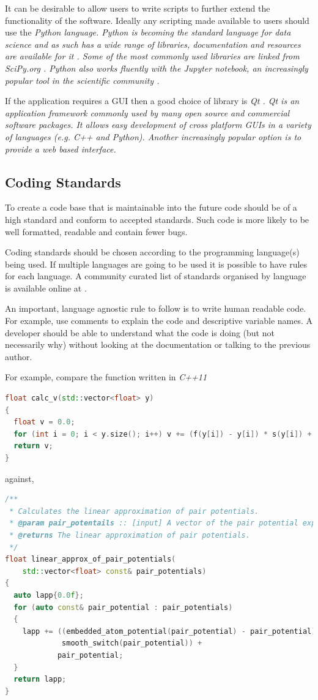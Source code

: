\documentclass[jnr]{iosart2x}
\begin{document}
It can be desirable to allow users to write scripts to further extend the functionality of the software.
Ideally any scripting made available to users should use the \it Python language.
Python is becoming the standard language for data science and as such has a wide range of libraries, documentation and resources are available for it \cite{python-nature}.
Some of the most commonly used libraries are linked from \it SciPy.org \cite{scipy}.
Python also works fluently with the \it{Jupyter notebook}, an increasingly popular tool in the scientific community \cite{jupyter-nature}.

If the application requires a GUI then a good choice of library is \it{Qt} \cite{Qt}.
\it Qt is an application framework commonly used by many open source and commercial software packages.
It allows easy development of cross platform GUIs in a variety of languages (e.g. \it C++ and \it Python).
Another increasingly popular option is to provide a web based interface.

\subsection{Coding Standards}
\label{Coding standards}

To create a code base that is maintainable into the future code should be of a high standard and conform to accepted standards.
Such code is more likely to be well formatted, readable and contain fewer bugs.

Coding standards should be chosen according to the programming language(s) being used.
If multiple languages are going to be used it is possible to have rules for each language.
A community curated list of standards organised by language is available online at \cite{Awesome_Guidelines}.

An important, language agnostic rule to follow is to write human readable code.
For example, use comments to explain the code and descriptive variable names.
A developer should be able to understand what the code is doing (but not necessarily why) without looking at the documentation or talking to the previous author.

For example, compare the function \cite{Lim_2015} written in \it{C++11}

\begin{lstlisting}[frame=single, language=C++]
float calc_v(std::vector<float> y)
{
  float v = 0.0;
  for (int i = 0; i < y.size(); i++) v += (f(y[i]) - y[i]) * s(y[i]) + y[i];
  return v;
}
\end{lstlisting}
against,
\begin{lstlisting}[frame=single, language=C++]
/**
 * Calculates the linear approximation of pair potentials.
 * @param pair_potentails :: [input] A vector of the pair potential experienced by each atom.
 * @returns The linear approximation of pair potentials.
 */
float linear_approx_of_pair_potentials(
    std::vector<float> const& pair_potentials)
{
  auto lapp{0.0f};
  for (auto const& pair_potential : pair_potentials)
  {
    lapp += ((embedded_atom_potential(pair_potential) - pair_potential) *
             smooth_switch(pair_potential)) +
            pair_potential;
  }
  return lapp;
}
\end{lstlisting}
\end{document}
